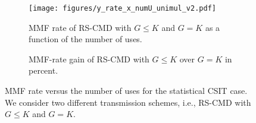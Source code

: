 \documentclass[12pt,draftcls,onecolumn]{IEEEtran}
\theoremstyle{remark}
\theoremstyle{definition}
\begin{document}
{%
\begin{figure}
	\centering
	\begin{subfigure}[t]{0.49\textwidth}
		\centering
		\texttt{[image: figures/y\_rate\_x\_numU\_unimul\_v2.pdf]}
		\caption{MMF rate of RS-CMD with $G\leq K$ and $G=K$ as a function of the number of uses.}
		\label{y_rate_x_numU_unimul_v2_im}
	\end{subfigure}\hfill
	\begin{subfigure}[t]{0.49\textwidth}
			\centering
		\vspace*{2.3cm}
		\caption{MMF-rate gain of RS-CMD with $G\leq K$ over $G=K$ in percent.}
		\label{y_rate_x_numU_unimul_v2_tb}
	\end{subfigure}
	\caption{MMF rate versus the number of uses for the statistical CSIT case. We consider two different transmission schemes, i.e., RS-CMD with $G\leq K$ and $G=K$.}
	\label{y_rate_x_numU}
\end{figure}
}
\end{document}
